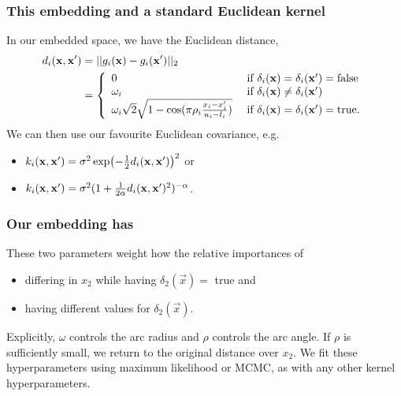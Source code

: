 \documentclass[12pt,onlymath]{beamer}
\begin{document}
\begin{frame}\frametitle{This embedding and a standard Euclidean kernel  }
In our embedded space, we have the Euclidean distance,
%
\begin{align*}
d_i(\mathbf{x}, \mathbf{x}') & = 
||g_i(\mathbf{x})-g_i(\mathbf{x}')||_2 \nonumber\\
& = \left\{\begin{array}{ll}
0 & \textrm{ if } \delta_i(\mathbf{x}) = \delta_i(\mathbf{x}') = \textrm{false}\\
\omega_i & \textrm{ if } \delta_i(\mathbf{x}) \neq \delta_i(\mathbf{x}')\\
\omega_i \sqrt{2} \sqrt{1 - \cos(\pi\rho_i \frac{x_i-x_i'}{u_i-l_i})} & \textrm{ if } \delta_i(\mathbf{x}) = \delta_i(\mathbf{x}') = \textrm{true}. \end{array}\right.
\label{eq:distance}
\end{align*}
We can then use our favourite Euclidean covariance, e.g.
\begin{itemize}
	\item $k_i(\mathbf{x}, \mathbf{x}') = \sigma^2 \exp\bigl(-\frac{1}{2}d_i(\mathbf{x}, \mathbf{x}') \bigr)^2$ or
	\item $k_i(\mathbf{x}, \mathbf{x}') = \sigma^2 (1+\frac{1}{2\alpha} d_i(\mathbf{x}, \mathbf{x}')^2)^{-\alpha}$.
\end{itemize}
\end{frame}

\begin{frame}\frametitle{Our embedding has }
These two parameters weight how the relative importances of 
\begin{itemize}
	\item differing in $x_2$ while having $\delta_2({\vec{x}})=$ true and
	\item having different values for $\delta_2({\vec{x}})$.
\end{itemize}
\vfill
Explicitly, $\omega$ controls the arc radius and $\rho$ controls the arc angle.
\vfill
If $\rho$ is sufficiently small, we return to the original distance over $x_2$.
\vfill
We fit these hyperparameters using maximum likelihood or MCMC, as with any other kernel hyperparameters.
\end{frame}
\end{document}
